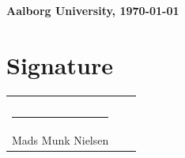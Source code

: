 \thispagestyle{plain}

\begin{flushright}
\textbf{Aalborg University, \today}
\end{flushright}
\vspace{20pt}
\section*{Signature} 
\begin{tabular}{lcl}
    & &\\
    & &\\
    \rule{7cm}{1pt} & \hspace{0.5cm}  \\
    \vspace{2.5cm}
    Mads Munk Nielsen & & 
\end{tabular}

